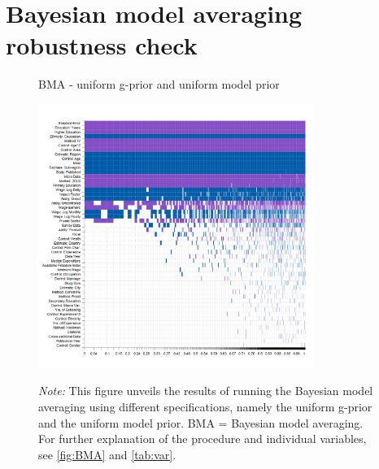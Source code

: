 \chapter{Bayesian model averaging robustness check}
\label{app:three}

\begin{figure}[!htbp]
\begin{center}
\caption{BMA - uniform g-prior and uniform model prior}
\label{fig:BMA2}
\includegraphics[width=0.8\textwidth]{Figures/BMA/bma_UIP_uniform_results.png}
\end{center}\vspace{-0.5cm}
\captionsetup{width=0.8\textwidth, font = scriptsize}
\caption*{\emph{Note:} This figure unveils the results of running the Bayesian model averaging using different specifications, namely the uniform g-prior and the uniform model prior. BMA = Bayesian model averaging. For further explanation of the procedure and individual variables, see \autoref{fig:BMA} and \autoref{tab:var}.
}
\end{figure}


